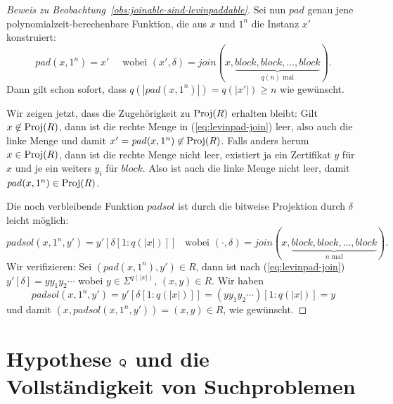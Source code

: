 \begin{proof}[Beweis zu Beobachtung~\ref{obs:joinable-sind-levinpaddable}]
    Sei nun $\mathit{pad}$ genau jene polynomialzeit-berechenbare Funktion, die aus $x$ und $1^n$ die Instanz $x'$ konstruiert:
    \[ \mathit{pad}(x, 1^n) = x' \quad\text{ wobei }
    (x',\delta)=\mathit{join}(x, \underbrace{\mathit{block}, \mathit{block}, \ldots, \mathit{block}}_{\text{$q(n)$ mal}}).\]
    Dann gilt schon sofort, dass $q(|\mathit{pad}(x, 1^n)|)=q(|x'|)\geq n$ wie gewünscht.

    Wir zeigen jetzt, dass die Zugehörigkeit zu $\operatorname{Proj}(R)$ erhalten bleibt:
    Gilt $x\not\in\operatorname{Proj}(R)$, dann ist die rechte Menge in (\ref{eq:levinpad-join}) leer, also auch die linke Menge und damit $x'=\mathit{pad}(x, 1^n)\not\in \operatorname{Proj}(R)$.
    Falls anders herum $x\in\operatorname{Proj}(R)$, dann ist die rechte Menge nicht leer, existiert ja ein Zertifikat $y$ für $x$ und je ein weiters $y_i$ für $\mathit{block}$. Also ist auch die linke Menge nicht leer, damit $\mathit{pad}(x, 1^n)\in \operatorname{Proj}(R)$.

    Die noch verbleibende Funktion $\mathit{padsol}$ ist durch die bitweise Projektion durch $\delta$ leicht möglich:
    \[
        \mathit{padsol}(x, 1^n, y') = y'[\delta[1:q(|x|)]] \enspace\text{ wobei } (\cdot, \delta) = \mathit{join}(x, \underbrace{\mathit{block}, \mathit{block}, \ldots, \mathit{block}}_{\text{$n$ mal}}).\]
    Wir verifizieren: Sei $(\mathit{pad}(x, 1^n), y')\in R$, dann ist nach (\ref{eq:levinpad-join}) $y'[\delta]=yy_1y_2\cdots$ wobei $y\in\Sigma^{q(|x|)}$, $(x, y)\in R$. 
    Wir haben
    \[ \mathit{padsol}(x, 1^n, y') = y'[\delta[1:q(|x|)]] = (yy_1y_2\cdots)[1:q(|x|)] = y \]
    und damit $(x, \mathit{padsol}(x, 1^n, y')) = (x, y)\in R$, wie gewünscht.
\end{proof}

\section{Hypothese $\mathsf{Q}$ und die Vollständigkeit von Suchproblemen}

